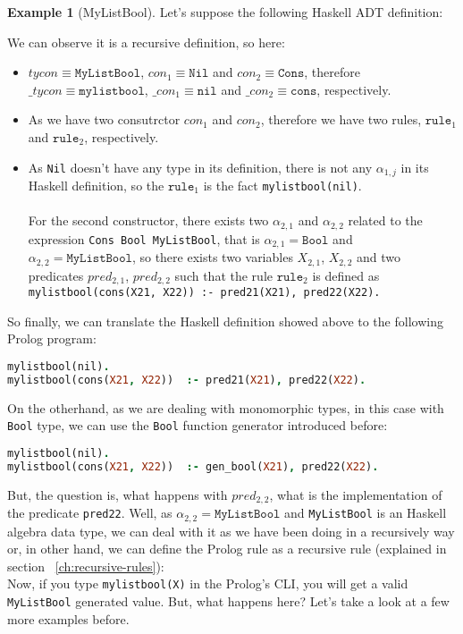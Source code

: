\documentclass{report}
\theoremstyle{definition}
\newtheorem{example}{Example}[section]
\theoremstyle{definition}
\newcommand{\ttt}[1]{\texttt{#1}}
\begin{document}
\begin{example}[MyListBool]
	Let's suppose the following Haskell ADT definition:
	
	We can observe it is a recursive definition, so here:
	\begin{itemize}
		\item $tycon \equiv \ttt{MyListBool}$, $con_1 \equiv \ttt{Nil}$ and $con_2 \equiv \ttt{Cons}$, therefore $\_tycon \equiv \ttt{mylistbool}$, $\_con_1 \equiv \ttt{nil}$ and $\_con_2 \equiv \ttt{cons}$, respectively.
		\item As we have two consutrctor $con_1$ and $con_2$, therefore we have two rules, $\ttt{rule}_1$ and $\ttt{rule}_2$, respectively.
		\item As \ttt{Nil} doesn't have any type in its definition, there is not any $\alpha_{1,j}$ in its Haskell definition, so the $\ttt{rule}_1$ is the fact \ttt{mylistbool(nil)}.\\\\
		For the second constructor, there exists two $\alpha_{2,1}$ and $\alpha_{2,2}$ related to the expression \ttt{Cons Bool MyListBool}, that is $\alpha_{2,1} = \ttt{Bool}$ and $\alpha_{2,2} = \ttt{MyListBool}$, so there exists two variables $X_{2,1}$, $X_{2,2}$ and two predicates $pred_{2,1}$, $pred_{2,2}$ such that the rule $\ttt{rule}_2$ is defined as \\ \ttt{mylistbool(cons(X21, X22)) :- pred21(X21), pred22(X22).}
	\end{itemize}
	So finally, we can translate the Haskell definition showed above to the following Prolog program:\\
\begin{lstlisting}[language=Prolog]
mylistbool(nil).																										%% rule 1
mylistbool(cons(X21, X22)) 	:- pred21(X21), pred22(X22).						%% rule 2
\end{lstlisting}
On the otherhand, as we are dealing with monomorphic types, in this case with \ttt{Bool} type, we can use the \ttt{Bool} function generator introduced before:\\
\begin{lstlisting}[language=Prolog]
mylistbool(nil).																										%% rule 1
mylistbool(cons(X21, X22)) 	:- gen_bool(X21), pred22(X22).					%% rule 2
\end{lstlisting}
But, the question is, what happens with $pred_{2,2}$, what is the implementation of the predicate \ttt{pred22}. Well, as $\alpha_{2,2} = \ttt{MyListBool}$ and \ttt{MyListBool} is an Haskell algebra data type, we can deal with it as we have been doing in a recursively way or, in other hand, we can define the Prolog rule as a recursive rule (explained in section ~\ref{ch:recursive-rules}):\\

Now, if you type \ttt{mylistbool(X)} in the Prolog's CLI, you will get a valid \ttt{MyListBool} generated value. But, what happens here? Let's take a look at a few more examples before.\\
\end{example}
\end{document}
